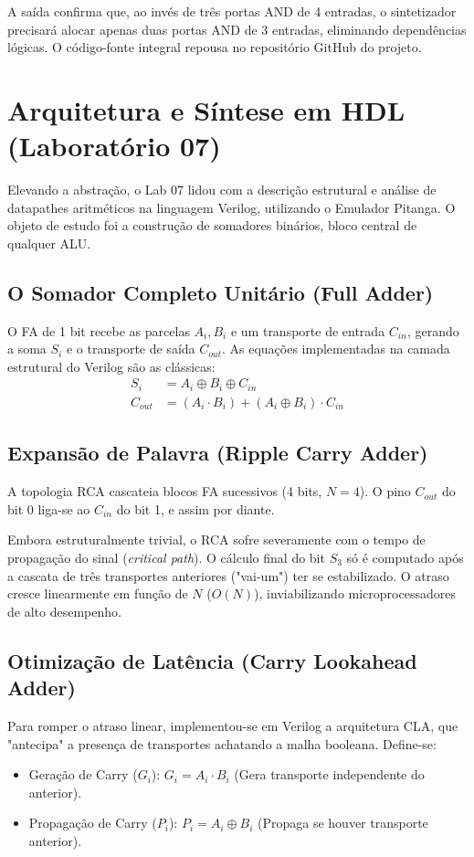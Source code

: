 \documentclass[conference]{IEEEtran}
\begin{document}
A saída confirma que, ao invés de três portas AND de 4 entradas, o sintetizador precisará alocar apenas duas portas AND de 3 entradas, eliminando dependências lógicas. O código-fonte integral repousa no repositório GitHub do projeto.

\section{Arquitetura e Síntese em HDL (Laboratório 07)}

Elevando a abstração, o Lab 07 lidou com a descrição estrutural e análise de datapathes aritméticos na linguagem Verilog, utilizando o Emulador Pitanga. O objeto de estudo foi a construção de somadores binários, bloco central de qualquer ALU.

\subsection{O Somador Completo Unitário (Full Adder)}
O FA de 1 bit recebe as parcelas $A_i, B_i$ e um transporte de entrada $C_{in}$, gerando a soma $S_i$ e o transporte de saída $C_{out}$. As equações implementadas na camada estrutural do Verilog são as clássicas:
\begin{align}
S_i &= A_i \oplus B_i \oplus C_{in} \\
C_{out} &= (A_i \cdot B_i) + (A_i \oplus B_i) \cdot C_{in}
\end{align}

\subsection{Expansão de Palavra (Ripple Carry Adder)}
A topologia RCA cascateia blocos FA sucessivos (4 bits, $N=4$). O pino $C_{out}$ do bit 0 liga-se ao $C_{in}$ do bit 1, e assim por diante. 

Embora estruturalmente trivial, o RCA sofre severamente com o tempo de propagação do sinal (\textit{critical path}). O cálculo final do bit $S_3$ só é computado após a cascata de três transportes anteriores ("vai-um") ter se estabilizado. O atraso cresce linearmente em função de $N$ ($O(N)$), inviabilizando microprocessadores de alto desempenho.

\subsection{Otimização de Latência (Carry Lookahead Adder)}
Para romper o atraso linear, implementou-se em Verilog a arquitetura CLA, que "antecipa" a presença de transportes achatando a malha booleana. Define-se:
\begin{itemize}
    \item Geração de Carry ($G_i$): $G_i = A_i \cdot B_i$ (Gera transporte independente do anterior).
    \item Propagação de Carry ($P_i$): $P_i = A_i \oplus B_i$ (Propaga se houver transporte anterior).
\end{itemize}
\end{document}
